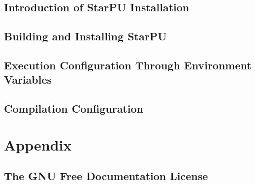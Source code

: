 %
%
%
%
%
\newcommand\starputitle{StarPU Handbook - StarPU Installation}
\setcounter{tocdepth}{2}


\chapter{Introduction of StarPU Installation}
\label{index}
\hypertarget{index}{}


\chapter{Building and Installing StarPU}
\label{BuildingAndInstallingStarPU}
\hypertarget{BuildingAndInstallingStarPU}{}


\chapter{Execution Configuration Through Environment Variables}
\label{ExecutionConfigurationThroughEnvironmentVariables}
\hypertarget{ExecutionConfigurationThroughEnvironmentVariables}{}


\chapter{Compilation Configuration}
\label{CompilationConfiguration}
\hypertarget{CompilationConfiguration}{}


\part{Appendix}

\chapter{The GNU Free Documentation License}
\label{GNUFreeDocumentationLicense}
\hypertarget{GNUFreeDocumentationLicense}{}




